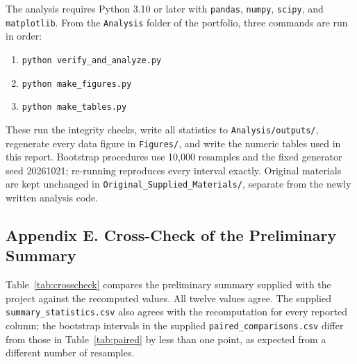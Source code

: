 \documentclass[11pt,a4paper]{article}
\begin{document}
The analysis requires Python 3.10 or later with \texttt{pandas}, \texttt{numpy}, \texttt{scipy}, and \texttt{matplotlib}. From the \texttt{Analysis} folder of the portfolio, three commands are run in order:
\begin{enumerate}
  \item \texttt{python verify\_and\_analyze.py}
  \item \texttt{python make\_figures.py}
  \item \texttt{python make\_tables.py}
\end{enumerate}
These run the integrity checks, write all statistics to \texttt{Analysis/outputs/}, regenerate every data figure in \texttt{Figures/}, and write the numeric tables used in this report. Bootstrap procedures use 10{,}000 resamples and the fixed generator seed 20261021; re-running reproduces every interval exactly. Original materials are kept unchanged in \texttt{Original\_Supplied\_Materials/}, separate from the newly written analysis code.

\subsection*{Appendix E. Cross-Check of the Preliminary Summary}

Table~\ref{tab:crosscheck} compares the preliminary summary supplied with the project against the recomputed values. All twelve values agree. The supplied \texttt{summary\_statistics.csv} also agrees with the recomputation for every reported column; the bootstrap intervals in the supplied \texttt{paired\_comparisons.csv} differ from those in Table~\ref{tab:paired} by less than one point, as expected from a different number of resamples.

\begin{table}[H]
\caption[Preliminary versus recomputed values]{Preliminary summary values versus values recomputed from the raw dataset.}\label{tab:crosscheck}
\centering\footnotesize
\setlength{\tabcolsep}{3.3pt}

\end{table}
\end{document}
